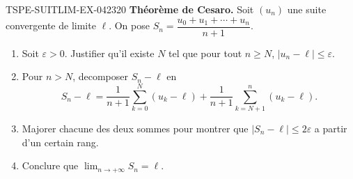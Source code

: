 \begin{exercice}{TSPE-SUITLIM-EX-042}{3}{20}
\textbf{Théorème de Cesaro.} Soit $(u_n)$ une suite convergente de limite $\ell$. On pose $S_n = \dfrac{u_0 + u_1 + \cdots + u_n}{n + 1}$.
\begin{enumerate}
  \item Soit $\varepsilon > 0$. Justifier qu'il existe $N$ tel que pour tout $n \geq N$, $|u_n - \ell| \leq \varepsilon$.
  \item Pour $n > N$, decomposer $S_n - \ell$ en
    \[
      S_n - \ell = \frac{1}{n+1}\sum_{k=0}^{N}(u_k - \ell) + \frac{1}{n+1}\sum_{k=N+1}^{n}(u_k - \ell).
    \]
  \item Majorer chacune des deux sommes pour montrer que $|S_n - \ell| \leq 2\varepsilon$ a partir d'un certain rang.
  \item Conclure que $\lim_{n \to +\infty} S_n = \ell$.
\end{enumerate}
\end{exercice}

